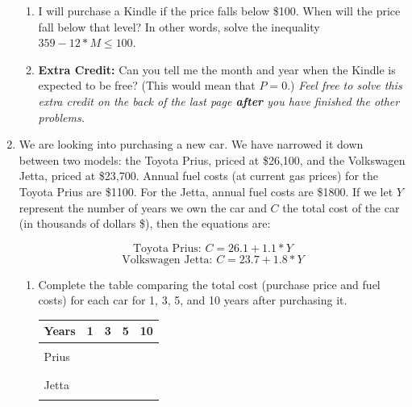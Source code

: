 \documentclass[12pt]{article}
\begin{document}
\begin{enumerate}
\begin{enumerate}

\item  I will purchase a Kindle if the price falls below \$100.  When will the price fall below that level?  In other words, solve the inequality $359-12 * M \le 100$.
\vfill
\item \textbf{Extra Credit:} Can you tell me the month and year when the Kindle is expected to be free?  (This would mean that $P=0$.) \emph{Feel free to solve this extra credit on the back of the last page \textbf{after} you have finished the other problems.}

\end{enumerate}

\newpage
\item We are looking into purchasing a new car.  We have narrowed it down between two models: the Toyota Prius, priced at \$26,100, and the Volkswagen Jetta, priced at \$23,700.  Annual fuel costs (at current gas prices) for the Toyota Prius are \$1100.  For the Jetta, annual fuel costs are \$1800.   If we let $Y$ represent the number of years we own the car and $C$ the total cost of the car (in thousands of dollars \$), then the equations are:

$$\text{Toyota Prius:  }C = 26.1 + 1.1*Y$$
$$\text{Volkswagen Jetta:  }C = 23.7 + 1.8*Y$$

\begin{enumerate}
\item Complete the table comparing the total cost (purchase price and fuel costs) for each car for 1, 3, 5, and 10 years after purchasing it.


\begin{center}
\begin{tabular} {|l |c |c |c |c |} \hline
Years &\hspace{.25in} 1\hspace{.25in} & \hspace{.25in}3\hspace{.25in} & \hspace{.25in}5\hspace{.25in} &\hspace{.25in}10\hspace{.25in} \\ \hline
&&&& \\ 
Prius &&&& \\ 
&&&& \\ \hline
&&&& \\ 
Jetta &&&& \\  
&&&& \\ \hline
\end{tabular}
\end{center}




\end{enumerate}
\end{enumerate}
\end{document}
